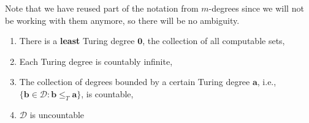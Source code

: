 \documentclass[../main.tex]{memoir}
\begin{document}
\begin{remark}
  Note that we have reused part of the notation from $m$-degrees since we will not be working with them anymore, so there will be no ambiguity.
\end{remark}

\begin{theorem}
  \begin{enumerate}
  \item There is a \textbf{least} Turing degree $\mathbf{0}$, the collection of all computable sets,
  \item Each Turing degree is countably infinite,
  \item The collection of degrees bounded by a certain Turing degree $\mathbf{a}$, i.e., $\{\mathbf{b} \in \mathbf{\mathcal{D}} : \mathbf{b} \le_T \mathbf{a}\}$, is countable,
  \item $\mathbf{\mathcal{D}}$ is uncountable
  \end{enumerate}
\end{theorem}
\end{document}
